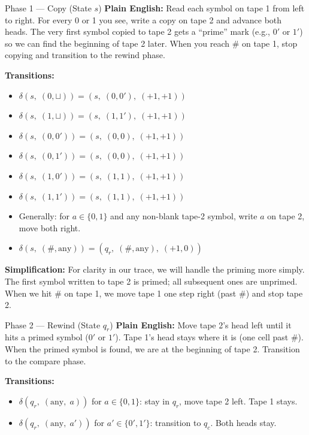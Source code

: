 \bigskip

\begin{definitionbox}{Phase 1 --- Copy (State $s$)}
\textbf{Plain English:} Read each symbol on tape 1 from left to right. For every 0 or 1 you see, write a copy on tape 2 and advance both heads. The very first symbol copied to tape 2 gets a ``prime'' mark (e.g., $0'$ or $1'$) so we can find the beginning of tape 2 later. When you reach $\#$ on tape 1, stop copying and transition to the rewind phase.

\textbf{Transitions:}
\begin{itemize}[nosep]
\item $\delta(s,\;(0,\sqcup)) = (s,\;(0, 0'),\;(+1, +1))$ 
\item $\delta(s,\;(1,\sqcup)) = (s,\;(1, 1'),\;(+1, +1))$ 
\item $\delta(s,\;(0,0')) = (s,\;(0, 0),\;(+1, +1))$ 
\item $\delta(s,\;(0,1')) = (s,\;(0, 0),\;(+1, +1))$ 
\item $\delta(s,\;(1,0')) = (s,\;(1, 1),\;(+1, +1))$
\item $\delta(s,\;(1,1')) = (s,\;(1, 1),\;(+1, +1))$
\item Generally: for $a \in \{0,1\}$ and any non-blank tape-2 symbol, write $a$ on tape 2, move both right.
\item $\delta(s,\;(\#,\text{any})) = (q_r,\;(\#, \text{any}),\;(+1, 0))$ 
\end{itemize}

\textbf{Simplification:} For clarity in our trace, we will handle the priming more simply. The first symbol written to tape 2 is primed; all subsequent ones are unprimed. When we hit $\#$ on tape 1, we move tape 1 one step right (past $\#$) and stop tape 2.
\end{definitionbox}

\begin{definitionbox}{Phase 2 --- Rewind (State $q_r$)}
\textbf{Plain English:} Move tape 2's head left until it hits a primed symbol ($0'$ or $1'$). Tape 1's head stays where it is (one cell past $\#$). When the primed symbol is found, we are at the beginning of tape 2. Transition to the compare phase.

\textbf{Transitions:}
\begin{itemize}[nosep]
\item $\delta(q_r,\;(\text{any},\;a))$ for $a \in \{0,1\}$: stay in $q_r$, move tape 2 left. Tape 1 stays.
\item $\delta(q_r,\;(\text{any},\;a'))$ for $a' \in \{0',1'\}$: transition to $q_c$. Both heads stay.
\end{itemize}
\end{definitionbox}

